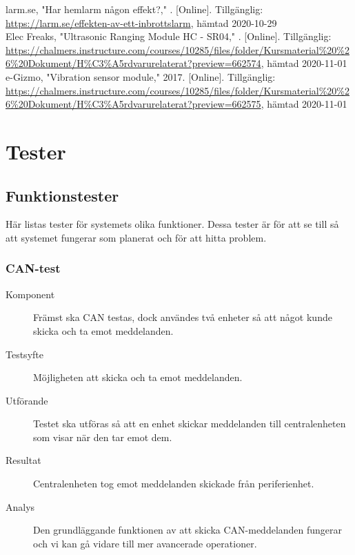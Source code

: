\documentclass[a4paper]{article}
\newcommand{\citewebpage}[6]{\noindent [#1] #2, "#3," #4. [Online]. Tillgänglig: \url{#5},  hämtad #6\\}
\begin{document}
\citewebpage{2}{larm.se}{Har hemlarm någon effekt?}{}{https://larm.se/effekten-av-ett-inbrottslarm}{2020-10-29}

\citewebpage{3}{Elec Freaks}{Ultrasonic Ranging Module HC - SR04}{}{https://chalmers.instructure.com/courses/10285/files/folder/Kursmaterial\%20\%26\%20Dokument/H\%C3\%A5rdvarurelaterat?preview=662574}{2020-11-01}

\citewebpage{4}{e-Gizmo}{Vibration sensor module}{2017}{https://chalmers.instructure.com/courses/10285/files/folder/Kursmaterial\%20\%26\%20Dokument/H\%C3\%A5rdvarurelaterat?preview=662575}{2020-11-01}

\newpage
\appendix
\section{Tester}
\label{bilaga-tester}
\subsection{Funktionstester}
Här listas tester för systemets olika funktioner.
Dessa tester är för att se till så att systemet fungerar som planerat och för att hitta problem.

\subsubsection{CAN-test}
\begin{description}
\item[Komponent] Främst ska CAN testas, dock användes två enheter så att något kunde skicka och ta emot meddelanden.

\item[Testsyfte] Möjligheten att skicka och ta emot meddelanden.

\item[Utförande] Testet ska utföras så att en enhet skickar meddelanden till centralenheten som visar när den tar emot dem.

\item[Resultat] Centralenheten tog emot meddelanden skickade från periferienhet.

\item[Analys] Den grundläggande funktionen av att skicka CAN-meddelanden fungerar och vi kan gå vidare till mer avancerade operationer.
\end{description}
\end{document}
